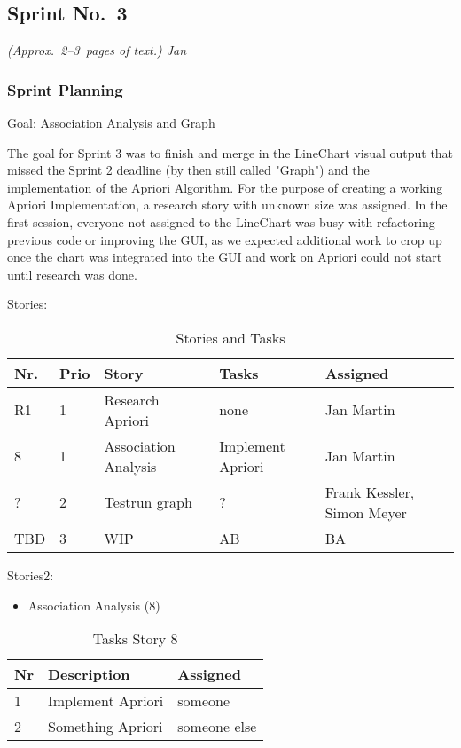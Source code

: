 \subsection{Sprint No.~3}

\emph{(Approx.~2--3~pages of text.) Jan}

\subsubsection*{Sprint Planning}

Goal: Association Analysis and Graph

The goal for Sprint 3 was to finish and merge in the LineChart visual output that missed the Sprint 2 deadline (by then still called "Graph") and the implementation of the Apriori Algorithm. 
For the purpose of creating a working Apriori Implementation, a research story with unknown size was assigned. 
In the first session, everyone not assigned to the LineChart was busy with refactoring previous code or improving the GUI, as we expected additional work to crop up once the chart was integrated into the GUI and work on Apriori could not start until research was done.

Stories: 

\begin{table}[h]
  \caption{Stories and Tasks}
  \label{User Stories Sprint 3}
  \centering
  \begin{tabular}{p{1cm}|p{1cm}|p{5cm}|p{3cm}|p{3cm}|}
  	Nr. & Prio & Story & Tasks & Assigned \\ 
  	\hline
  	\hline
  	R1 & 1 & Research Apriori & none & Jan Martin \\ 
  	\hline
  	8 & 1 & Association Analysis & Implement Apriori & Jan Martin \\ 
  	\hline
  	? & 2 & Testrun graph & ? & Frank Kessler, Simon Meyer \\ 
  	\hline
  	TBD & 3 & WIP & AB & BA \\ 
  	\hline
  \end{tabular}
\end{table}

Stories2: 

\begin{itemize}
	\item Association Analysis (8) 
	\end{itemize}
	
\begin{table}[h]
  \caption{Tasks Story 8}
  \label{Story 8 Tasks}
  \centering
  \begin{tabular}{p{1cm}|p{5cm}|p{3cm}|}
  	Nr & Description & Assigned \\ 
  	\hline
  	1 & Implement Apriori & someone \\ 
  	\hline
  	2 & Something Apriori & someone else \\ 
  	\hline
  \end{tabular}
\end{table}
	
